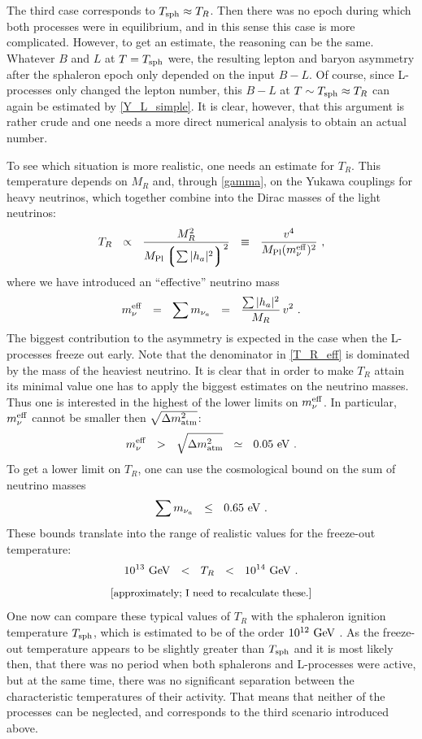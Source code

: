 \documentclass[12pt]{revtex4}
\newcommand{\lgr}{\left\lgroup}
\newcommand{\rgr}{\right\rgroup}
\newcommand{\Mpl}{M_{\rm Pl}}
\newcommand{\Tsph}{T_{\rm sph}}
\newcommand{\meff}{m^{\rm eff}_\nu}
\newcommand{\GeV}{{\rm GeV}}
\newcommand{\eV}{{\rm eV}}
\begin{document}
	The third case corresponds to $ \Tsph \approx T_R $.
	Then there was no epoch during which both processes
	were in equilibrium, and in this sense this case is more complicated.
	However, to get an estimate, the reasoning can be 
	the same.
	Whatever $ B $ and $ L $ at $ T = \Tsph $ were, the resulting
	lepton and baryon asymmetry after the sphaleron epoch only
	depended on the input $ B - L $.
	Of course, since L-processes only changed the lepton number,
	this $ B - L $ at  $ T \sim \Tsph \approx T_R $ can 
	again be estimated by \eqref{Y_L_simple}.
	It is clear, however, that this argument is rather crude and 
	one needs a more direct numerical analysis to obtain an actual
	number.

	To see which situation is more realistic, one needs an estimate
	for $ T_R $. 
	This temperature depends on $ M_R $ and, through \eqref{gamma},
	on the Yukawa couplings for heavy neutrinos, which together 
	combine into the Dirac masses of the light neutrinos:
\begin{equation}
\label{T_R_eff}
	T_R  ~~\propto~~ \frac{M_R^2}{\Mpl \lgr \sum |h_a|^2 \rgr^2}
		~~\equiv~~ \frac{v^4}{\Mpl (\meff)^2}~,
\end{equation}
	where we have introduced an ``effective'' neutrino mass
\[
	\meff ~~=~~ \sum m_{\nu_a} ~~=~~ \frac{\sum |h_a|^2}{M_R}\,v^2~.
\]
	The biggest contribution to the asymmetry is expected in the case
	when the L-processes freeze out early. 
	Note that the denominator in \eqref{T_R_eff} is dominated by the mass
	of the heaviest neutrino.
	It is clear that in order to make $ T_R $  attain its minimal
	value one has to apply the biggest estimates on the neutrino masses.
	Thus one is interested in the highest of the lower limits on
	$ \meff $.
	In particular, $ \meff $ cannot be smaller then 
	$ \sqrt{\Delta m_{\rm atm}^2}$:
\[
	\meff ~~>~~ \sqrt{\Delta m_{\rm atm}^2} ~~\simeq~~ 0.05~\eV~.
\]
	To get a lower limit on $ T_R $, one can use the cosmological
	bound on the sum of neutrino masses
\[
	\sum m_{\nu_a} ~~\leq~~ 0.65~\eV~.
\]
	These bounds translate into the range of realistic values for the
	freeze-out temperature:
\[
	10^{13}~\GeV ~~<~~ T_R ~~<~~ 10^{14}~\GeV~.
\]
\[
	[\textrm{\small approximately; I need to recalculate these.}]
\]
	One now can compare these typical values of $ T_R $ with the 
	sphaleron ignition temperature $ \Tsph $, which is estimated
	to be of the order $ 10^{12}~\GeV $ 
\cite{Buchmuller:2005eh}.
	As the freeze-out temperature appears to be slightly greater
	than $ \Tsph $ and 	
	it is most likely then, that there was no period when
	both sphalerons and L-processes were active, but at the same
	time, there was no significant separation between the characteristic 
	temperatures of their activity.
	That means that neither of the processes can be neglected,
	and corresponds to the third scenario introduced above.
\end{document}

